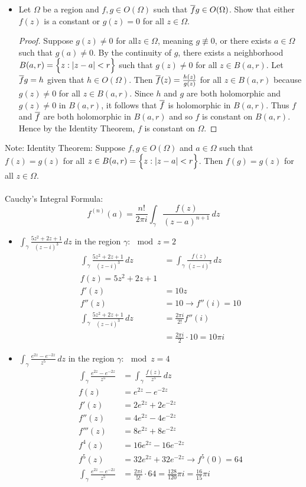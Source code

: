 \documentclass[12pt]{article}
\begin{document}
\begin{itemize}
\begin{proof}
\end{proof} 
\item Let $\Omega$ be a region and $f,g \in O(\Omega)$ such that $\overline{f}g \in O(\Omega)$. Show that either $f(z)$ is a constant or $g(z) = 0$ for all $z \in \Omega$. 
\begin{proof} Suppose $g(z) \neq 0$ for all$ z \in \Omega$, meaning $g \not\equiv 0$, or there exists $a \in \Omega$ such that $g(a) \neq 0$. By the continuity of $g$, there exists a neighborhood $B(a,r) = \Big\{ z: \abs{z-a} <r \Big\}$ such that $g(z) \neq 0$ for all $z \in B(a,r)$. Let $\overline{f}g=h$ given that $h \in O(\Omega)$. Then $\overline{f}(z) = \frac{h(z)}{g(z)}$ for all $z \in B(a,r)$ because $g(z) \neq 0$ for all $z \in B(a,r)$. Since $h$ and $g$ are both holomorphic and $g(z) \neq 0$ in $B(a,r)$, it follows that $\overline{f}$ is holomorphic in $B(a,r)$. Thus $f$ and $\overline{f}$ are both holomorphic in $B(a,r)$ and so $f$ is constant on $B(a,r)$. Hence by the Identity Theorem, $f$ is constant on $\Omega$. \end{proof}
\end{itemize} 
Note: Identity Theorem: Suppose $f,g \in O(\Omega)$ and $a \in \Omega$ such that $f(z) = g(z)$ for all $z \in B(a,r) = \Big\{ z: \abs{z-a} < r \Big\}$. Then $f(g) = g(z)$ for all $z \in \Omega$.
\\~\\
Cauchy's Integral Formula: $$ f^{(n)}(a) = \frac{n!}{2\pi i} \int_\gamma \frac{f(z)}{(z-a)^{n+1}} \, dz $$ 
\begin{itemize} 
\item $\int_\gamma \frac{5z^2 + 2z + 1}{(z-i)^3} \, dz$ in the region $\gamma: \mod{z} = 2$ $$ \begin{aligned} 
\int_\gamma \frac{5z^2 + 2z + 1}{(z-i)^3} \, dz &= \int_\gamma \frac{f(z)}{(z-i)^3} \, dz \\ f(z) = 5z^2 + 2z + 1 \\ f'(z) &= 10z \\ f''(z) &= 10 \to f''(i) = 10 \\ 
\int_\gamma \frac{5z^2 + 2z + 1}{(z-i)^3} \, dz &= \frac{2\pi i}{2!} f''(i) \\ &= \frac{2\pi i}{2} \cdot 10 = 10 \pi i \end{aligned} $$ 
\item $\int_\gamma \frac{e^{2z} - e^{-2z}}{z^5} \, dz $ in the region $\gamma: \mod{z} = 4$ $$ \begin{aligned} 
\int_\gamma \frac{e^{2z} - e^{-2z}}{z^5} &= \int_\gamma \frac{f(z)}{z^5} \, dz \\ f(z) &= e^{2z} - e^{-2z} \\ f'(z) &= 2e^{2z} + 2e^{-2z} \\ f''(z) &= 4e^{2z} - 4e^{-2z} \\ f'''(z) &= 8e^{2z} + 8e^{-2z} \\ f^4(z) &= 16e^{2z} - 16e^{-2z} \\ f^5(z) &= 32e^{2z} + 32e^{-2z} \to f^5(0) = 64 \\ \int_\gamma \frac{e^{2z} - e^{-2z}}{z^5} &= \frac{2\pi i}{5!} \cdot 64 = \frac{128}{120}\pi i = \frac{16}{15} \pi i \end{aligned} $$ \end{itemize} 
\end{document}
